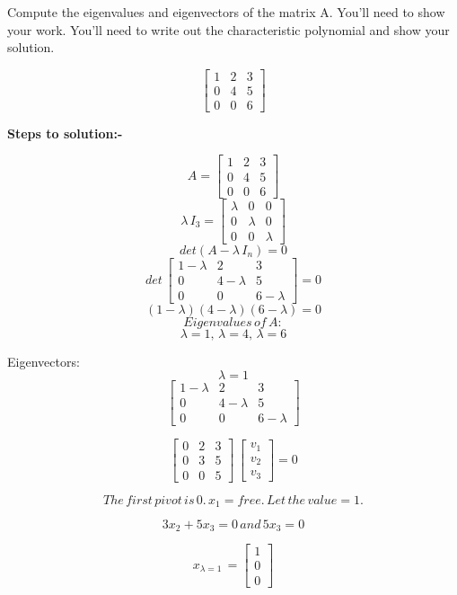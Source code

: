 \documentclass[]{article}
\begin{document}
Compute the eigenvalues and eigenvectors of the matrix A. You'll need to
show your work. You'll need to write out the characteristic polynomial
and show your solution.

\[\begin{bmatrix} 1 & 2 & 3 \\ 0 & 4 & 5 \\ 0 & 0 & 6 \end{bmatrix}\]

\textbf{Steps to solution:-}

\[ A = \begin{bmatrix}1 & 2 & 3 \\0 & 4 & 5 \\0 & 0 & 6 \end{bmatrix}\]
\[ \lambda\,I_3 = \begin{bmatrix}\lambda & 0 & 0 \\0 & \lambda & 0 \\0 & 0 & \lambda \end{bmatrix}\]
\[ det(A-\lambda\,I_n)=0\]
\[ det\,\begin{bmatrix}1-\lambda & 2 & 3 \\0 & 4-\lambda & 5 \\0 & 0 & 6-\lambda \end{bmatrix} = 0\]
\[(1-\lambda)(4-\lambda)(6-\lambda)=0\] \[ Eigenvalues\,of\,A:\]
\[\lambda=1,\, \lambda=4,\, \lambda=6\]

Eigenvectors:\\
\[\lambda=1\]
\[ \begin{bmatrix}1-\lambda & 2 & 3 \\0 & 4-\lambda & 5 \\0 & 0 & 6-\lambda \end{bmatrix}\]

\[ \begin{bmatrix}0 & 2 & 3 \\0 & 3 & 5\\0 & 0 & 5\end{bmatrix}\,\begin{bmatrix}v_1 \\v_2 \\v_3\end{bmatrix}=0\]

\[The\,first\,pivot\,is\,0.\,x_1 = free.\,Let\,the\,value=1.\]

\[3 x_2 + 5 x_3 = 0 \,and\, 5 x_3 = 0\]

\[x_{\lambda=1}\,=\begin{bmatrix}1 \\0 \\0\end{bmatrix}\]
\end{document}
